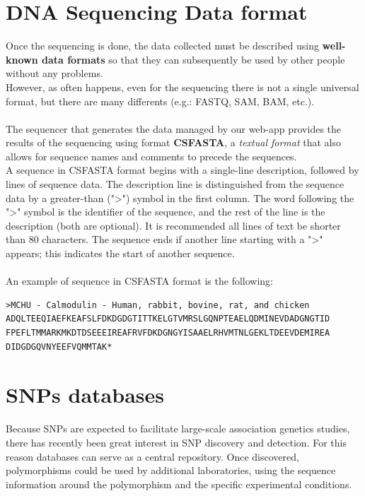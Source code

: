 \newpage


\section{DNA Sequencing Data format}

Once the sequencing is done, the data collected must be described using \textbf{well-known data formats} so that they can subsequently be used by other people without any problems.
\\ However, as often happens, even for the sequencing there is not a single universal format, but there are many differents (e.g.: FASTQ, SAM, BAM, etc.). 
\\
\\The sequencer that generates the data managed by our web-app provides the results of the sequencing using format \textbf{CSFASTA}, a \emph{textual format} that also allows for sequence names and comments to precede the sequences.
\\A sequence in CSFASTA format begins with a single-line description, followed by lines of sequence data. The description line is distinguished from the sequence data by a greater-than (">") symbol in the first column. The word following the ">" symbol is the identifier of the sequence, and the rest of the line is the description (both are optional). It is recommended all lines of text be shorter than 80 characters. The sequence ends if another line starting with a ">" appears; this indicates the start of another sequence.
\\
\\An example of sequence in CSFASTA format is the following:

\vspace{5mm}

\begin{lstlisting}     
>MCHU - Calmodulin - Human, rabbit, bovine, rat, and chicken
ADQLTEEQIAEFKEAFSLFDKDGDGTITTKELGTVMRSLGQNPTEAELQDMINEVDADGNGTID
FPEFLTMMARKMKDTDSEEEIREAFRVFDKDGNGYISAAELRHVMTNLGEKLTDEEVDEMIREA
DIDGDGQVNYEEFVQMMTAK*
\end{lstlisting}


\section{SNPs databases}

Because SNPs are expected to facilitate large-scale association genetics studies, there has recently been great interest in SNP discovery and detection. For this reason databases can serve as a central repository. Once discovered, polymorphisms could be used by additional laboratories, using the sequence information around the polymorphism and the specific experimental conditions.

